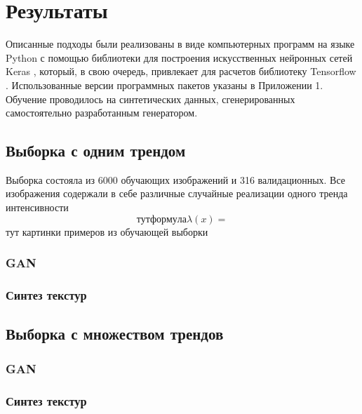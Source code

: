 \section{Результаты}
	Описанные подходы были реализованы в виде компьютерных программ на языке Python с помощью библиотеки для построения искусственных нейронных сетей Keras \cite{keras}, который, в свою очередь, привлекает для расчетов библиотеку Tensorflow \cite{tf}. Использованные версии программных пакетов указаны в Приложении 1. Обучение проводилось на синтетических данных, сгенерированных самостоятельно разработанным генератором. 
	\subsection{Выборка с одним трендом}
		Выборка состояла из 6000 обучающих изображений и 316 валидационных. Все изображения содержали в себе различные случайные реализации одного тренда интенсивности
		$$тут формула \lambda(x) = $$
		тут картинки примеров из обучающей выборки
		\subsubsection{GAN}
		\subsubsection{Синтез текстур}
	\subsection{Выборка с множеством трендов}
		\subsubsection{GAN}
		\subsubsection{Синтез текстур}